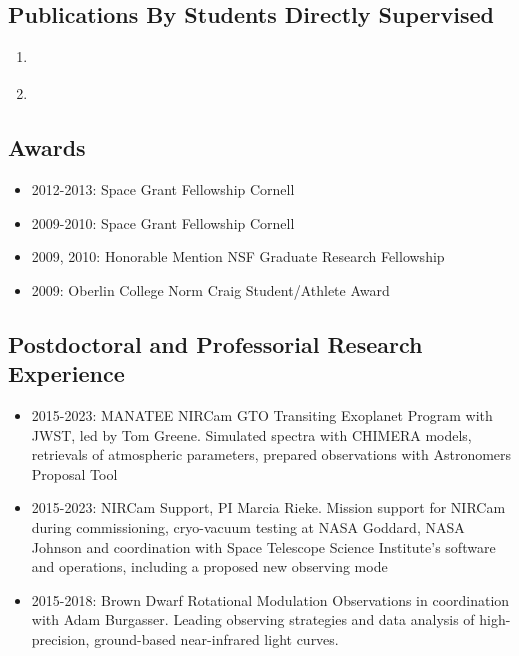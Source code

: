 \documentclass[11pt, oneside]{article}   	%
\begin{document}
\subsection*{Publications By Students Directly Supervised}

\begin{enumerate}[noitemsep]
\item \citet{baka2021peeringThroughDebris}
\item \citet{glidic2022corot1}
\end{enumerate}


%
%

\vspace{-0.15in}
\subsection*{Awards}
\begin{itemize}[noitemsep]
        \item 2012-2013: Space Grant Fellowship Cornell
        \item 2009-2010: Space Grant Fellowship Cornell
        \item 2009, 2010: Honorable Mention NSF Graduate Research Fellowship 
        \item 2009: Oberlin College Norm Craig Student/Athlete Award
\end{itemize}

\subsection*{Postdoctoral and Professorial Research Experience}
\begin{itemize}[noitemsep]
	\item 2015-2023: MANATEE NIRCam GTO Transiting Exoplanet Program with JWST, led by Tom Greene. Simulated spectra with CHIMERA models, retrievals of atmospheric parameters, prepared observations with Astronomers Proposal Tool
	\item 2015-2023: NIRCam Support, PI Marcia Rieke. Mission support for NIRCam during commissioning, cryo-vacuum testing at NASA Goddard, NASA Johnson and coordination with Space Telescope Science Institute's software and operations, including a proposed new observing mode
	\item 2015-2018: Brown Dwarf Rotational Modulation Observations in coordination with Adam Burgasser. Leading observing strategies and data analysis of high-precision, ground-based near-infrared light curves.
\end{itemize}
\end{document}
